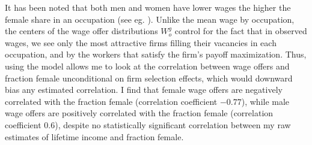 \documentclass[12pt]{article}
\begin{document}

It has been noted that both men and women have lower wages the higher the female share in an occupation (see eg. ). Unlike the mean wage by occupation, the centers of the wage offer distributions $W^g_o $ control for the fact that in observed wages, we see only the most attractive firms filling their vacancies in each occupation, and by the workers that satisfy the firm's payoff maximization. Thus, using the model allows me to look at the correlation between wage offers and fraction female unconditional on firm selection effects, which would downward bias any estimated correlation. I find that female wage offers are negatively correlated with the fraction female (correlation coefficient $-0.77$), while male wage offers are positively correlated with the fraction female (correlation coefficient $0.6$), despite no statistically significant correlation between my raw estimates of lifetime income and fraction female.








\end{document}
